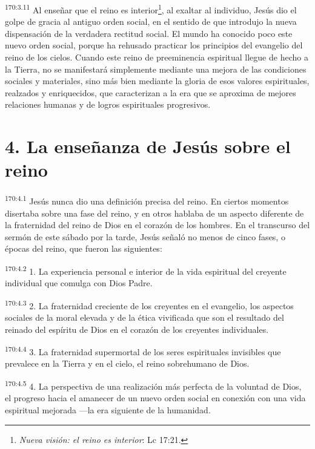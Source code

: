 \par 
\textsuperscript{170:3.11} Al enseñar que el reino es interior\footnote{\textit{Nueva visión: el reino es interior}: Lc 17:21.}, al exaltar al individuo, Jesús dio el golpe de gracia al antiguo orden social, en el sentido de que introdujo la nueva dispensación de la verdadera rectitud social. El mundo ha conocido poco este nuevo orden social, porque ha rehusado practicar los principios del evangelio del reino de los cielos. Cuando este reino de preeminencia espiritual llegue de hecho a la Tierra, no se manifestará simplemente mediante una mejora de las condiciones sociales y materiales, sino más bien mediante la gloria de esos valores espirituales, realzados y enriquecidos, que caracterizan a la era que se aproxima de mejores relaciones humanas y de logros espirituales progresivos.

\section*{4. La enseñanza de Jesús sobre el reino}
\par 
\textsuperscript{170:4.1} Jesús nunca dio una definición precisa del reino. En ciertos momentos disertaba sobre una fase del reino, y en otros hablaba de un aspecto diferente de la fraternidad del reino de Dios en el corazón de los hombres. En el transcurso del sermón de este sábado por la tarde, Jesús señaló no menos de cinco fases, o épocas del reino, que fueron las siguientes:

\par 
\textsuperscript{170:4.2} 1. La experiencia personal e interior de la vida espiritual del creyente individual que comulga con Dios Padre.

\par 
\textsuperscript{170:4.3} 2. La fraternidad creciente de los creyentes en el evangelio, los aspectos sociales de la moral elevada y de la ética vivificada que son el resultado del reinado del espíritu de Dios en el corazón de los creyentes individuales.

\par 
\textsuperscript{170:4.4} 3. La fraternidad supermortal de los seres espirituales invisibles que prevalece en la Tierra y en el cielo, el reino sobrehumano de Dios.

\par 
\textsuperscript{170:4.5} 4. La perspectiva de una realización más perfecta de la voluntad de Dios, el progreso hacia el amanecer de un nuevo orden social en conexión con una vida espiritual mejorada ---la era siguiente de la humanidad.

